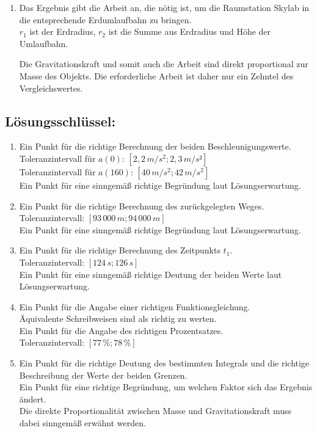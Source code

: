 \begin{langesbeispiel}
{\begin{enumerate}
\item Das Ergebnis gibt die Arbeit an, die nötig ist, um die Raumstation Skylab in die entsprechende Erdumlaufbahn zu bringen.\\
$r_1$ ist der Erdradius, $r_2$ ist die Summe aus Erdradius und Höhe der Umlaufbahn.

Die Gravitationskraft und somit auch die Arbeit sind direkt proportional zur Masse des Objekts. Die erforderliche Arbeit ist daher nur ein Zehntel des Vergleichswertes.
			\end{enumerate}
			
			\subsection{Lösungsschlüssel:}
\begin{enumerate}
\item Ein Punkt für die richtige Berechnung der beiden Beschleunigungswerte.\\
Toleranzintervall für $a(0):\,[2,2\,m/s^2; 2,3\,m/s²]$\\
Toleranzintervall für $a(160):\,[40\,m/s^2; 42\,m/s^2]$\\
Ein Punkt für eine sinngemäß richtige Begründung laut Lösungserwartung.

\item Ein Punkt für die richtige Berechnung des zurückgelegten Weges.\\
Toleranzintervall: $[93\,000\,m; 94\,000\,m]$\\
Ein Punkt für eine sinngemäß richtige Begründung laut Lösungserwartung.

\item Ein Punkt für die richtige Berechnung des Zeitpunkts $t_1$.\\
Toleranzintervall: $[124\,s; 126\,s]$\\
Ein Punkt für eine sinngemäß richtige Deutung der beiden Werte laut Lösungserwartung.

\item Ein Punkt für die Angabe einer richtigen Funktionsgleichung.\\
Äquivalente Schreibweisen sind als richtig zu werten.\\
Ein Punkt für die Angabe des richtigen Prozentsatzes.\\
Toleranzintervall: $[77\,\%; 78\,\%]$

\item Ein Punkt für die richtige Deutung des bestimmten Integrals und die richtige Beschreibung
der Werte der beiden Grenzen.\\
Ein Punkt für eine richtige Begründung, um welchen Faktor sich das Ergebnis ändert.\\
Die direkte Proportionalität zwischen Masse und Gravitationskraft muss dabei sinngemäß
erwähnt werden.
\end{enumerate}}
		\end{langesbeispiel}